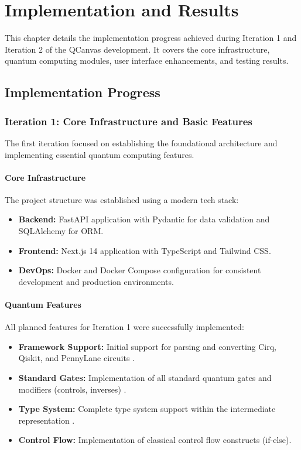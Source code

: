 \chapter{Implementation and Results}

This chapter details the implementation progress achieved during Iteration 1 and Iteration 2 of the QCanvas development. It covers the core infrastructure, quantum computing modules, user interface enhancements, and testing results.

\section{Implementation Progress}

\subsection{Iteration 1: Core Infrastructure and Basic Features}

The first iteration focused on establishing the foundational architecture and implementing essential quantum computing features.

\subsubsection{Core Infrastructure}
The project structure was established using a modern tech stack:
\begin{itemize}
    \item \textbf{Backend:} FastAPI application with Pydantic for data validation and SQLAlchemy for ORM.
    \item \textbf{Frontend:} Next.js 14 application with TypeScript and Tailwind CSS.
    \item \textbf{DevOps:} Docker and Docker Compose configuration for consistent development and production environments.
\end{itemize}

\subsubsection{Quantum Features}
All planned features for Iteration 1 were successfully implemented:
\begin{itemize}
    \item \textbf{Framework Support:} Initial support for parsing and converting Cirq, Qiskit, and PennyLane circuits \cite{qiskit, cirq_developers_2023, bergholm2018pennylane}.
    \item \textbf{Standard Gates:} Implementation of all standard quantum gates and modifiers (controls, inverses) \cite{nielsen2010quantum}.
    \item \textbf{Type System:} Complete type system support within the intermediate representation \cite{cross2021openqasm}.
    \item \textbf{Control Flow:} Implementation of classical control flow constructs (if-else).
\end{itemize}

